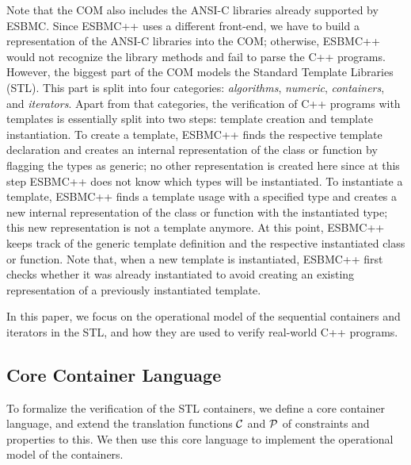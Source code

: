 \documentclass[conference]{IEEEtran}
\begin{document}
Note that the COM also includes the ANSI-C libraries already
supported by ESBMC.  Since ESBMC++ uses a different front-end, we have to build
a representation of the ANSI-C libraries into the COM; otherwise, ESBMC++ would
not recognize the library methods and fail to parse the C++ programs.
%
However, the biggest part of the COM models
the Standard Template Libraries (STL).
This part is split into
four categories: \textit{algorithms}, \textit{numeric},
\textit{containers}, and \textit{iterators}.
Apart from that categories, the verification of C++ programs with
templates is essentially split into two steps: template creation
and template instantiation. To create a template, ESBMC++ finds
the respective template declaration and creates an internal representation
of the class or function by flagging the types as generic; no other representation
is created here since at this step ESBMC++ does not know which types will be
instantiated. To instantiate a template, ESBMC++ finds a template usage
with a specified type and creates a new internal representation of the
class or function with the instantiated type; this new representation
is not a template anymore. At this point, ESBMC++ keeps track of the
generic template definition and the respective instantiated class or function.
Note that, when a new template is instantiated, ESBMC++ first checks whether it was already
instantiated to avoid creating an existing representation of a previously
instantiated template.

In this paper, we focus on the operational model of the
sequential containers and iterators in the STL,
and how they are used to
verify real-world C++ programs.



\subsection{Core Container Language}

To formalize the verification of the STL containers,
we define a core container language, and extend the translation
functions $\cal C$ and  $\cal P$ of constraints and properties to this.
We then use this core language to implement the operational model
of the containers.
\end{document}
